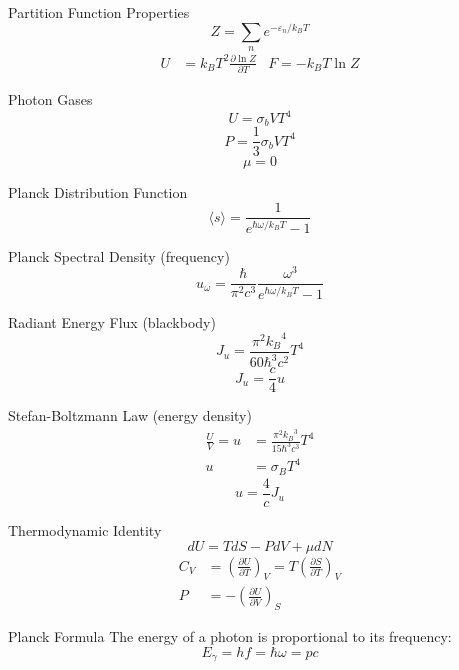 \documentclass[avery5371,grid]{flashcards}
\begin{document}
\begin{flashcard}[Formula]{Partition Function Properties}
	\[ Z = \sum_n e^{-{\varepsilon}_n / k_B T} \]
	\begin{align*}
		U &= k_B T^2 \frac{{\partial} \ln Z}{{\partial}T}
			& F = -k_B T \ln Z
	\end{align*}
\end{flashcard}

\begin{flashcard}[Theory]{Photon Gases}
	\[ U = {\sigma}_b VT^4 \]
	\[ P = \frac 13 {\sigma}_b VT^4 \]
	\[ {\mu} = 0 \]
\end{flashcard}

\begin{flashcard}[Formula]{Planck Distribution Function}
	\[ \langle s\rangle  = \frac{1}{e^{{\hbar}{\omega}/k_B T} - 1} \]
\end{flashcard}

\begin{flashcard}[Formula]{Planck Spectral Density (frequency)}
	\[ u_{\omega} = \frac{{\hbar}}{{\pi}^2c^3} \frac{{\omega}^3}{e^{{\hbar}{\omega}/k_B T} - 1} \]
\end{flashcard}

\begin{flashcard}[Formula]{Radiant Energy Flux (blackbody)}
	\[ J_u = \frac{{\pi}^2{k_B}^4}{60{\hbar}^3c^2} T^4 \]
	\[ J_u = \frac{c}{4} u \]
\end{flashcard}

\begin{flashcard}[Formula]{Stefan-Boltzmann Law (energy density)}
	\begin{align*}
		\frac{U}{V} = u &= \frac{{\pi}^2{k_B}^3}{15{\hbar}^3c^3} T^4 \\
			u &= {\sigma}_B T^4
	\end{align*}
	\[ u = \frac{4}{c} J_u \]
\end{flashcard}

\begin{flashcard}[Definition]{Thermodynamic Identity}
	\[ dU = T dS - P dV + {\mu} dN \]
	\begin{align*}
		C_V &= (\frac{{\partial}U}{{\partial}T})_V = T (\frac{{\partial}S}{{\partial}T})_V\\
		P   &= -(\frac{{\partial}U}{{\partial}V})_S
	\end{align*}
\end{flashcard}

\begin{flashcard}[Definition]{Planck Formula}
	The energy of a photon is proportional to its frequency: $$E_{\gamma} = hf = \hbar\omega = pc$$
\end{flashcard}
\end{document}
